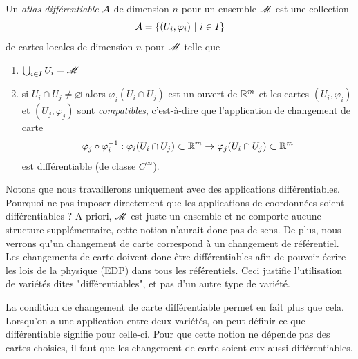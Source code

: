 \documentclass[a4paper,11pt]{report}
\begin{document}
            \begin{defn}
                Un \textit{atlas différentiable} $\mathcal{A}$ de dimension $n$ pour un ensemble $\mathscr{M}$ est une collection 
                \begin{equation}
                    \mathcal{A} = \left\{ (U_i,\varphi_i)~|~i\in I \right\}
                \end{equation}
                de cartes locales de dimension $n$ pour $\mathscr{M}$ telle que
                \begin{enumerate}[label=\textit{(\roman*)}]
                    \item $\bigcup_{i\in I} U_i = \mathscr{M}$
                    \item si $U_i\cap U_j \neq \varnothing$ alors $\varphi_i(U_i\cap U_j)$ est un ouvert de $\mathbb{R}^m$ et les cartes $(U_i,\varphi_i)$ et $(U_j,\varphi_j)$ sont \textit{compatibles}, c'est-à-dire que l'application de changement de carte
                        \begin{equation}
                            \varphi_j\circ\varphi_i^{-1}:\varphi_i(U_i\cap U_j)\subset\mathbb{R}^m\to\varphi_j(U_i\cap U_j)\subset\mathbb{R}^m
                        \end{equation}
                        est différentiable (de classe $C^\infty$).
                \end{enumerate}
            \end{defn}
            
            Notons que nous travaillerons uniquement avec des applications différentiables. Pourquoi ne pas imposer directement que les applications de coordonnées soient différentiables ? A priori, $\mathscr{M}$ est juste un ensemble et ne comporte aucune structure supplémentaire, cette notion n'aurait donc pas de sens. De plus, nous verrons qu'un changement de carte correspond à un changement de référentiel. Les changements de carte doivent donc être différentiables afin de pouvoir écrire les lois de la physique (EDP) dans tous les référentiels. Ceci justifie l'utilisation de variétés dites "différentiables", et pas d'un autre type de variété.
            
            \begin{rmk}
                La condition de changement de carte différentiable permet en fait plus que cela. Lorsqu'on a une application entre deux variétés, on peut définir ce que différentiable signifie pour celle-ci. Pour que cette notion ne dépende pas des cartes choisies, il faut que les changement de carte soient eux aussi différentiables.
            \end{rmk}
            
\end{document}
